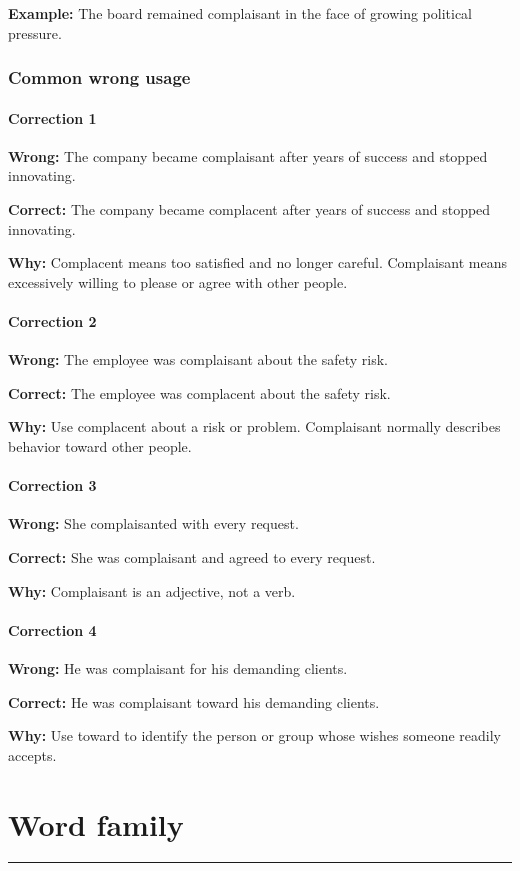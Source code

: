 \documentclass[11pt]{article}
\newcommand{\sectionrule}{\par\vspace{-0.5em}\noindent\textcolor{Accent}{\rule{\linewidth}{0.6pt}}\par}
\begin{document}
\textbf{Example:} The board remained complaisant in the face of growing political pressure.

\subsubsection{Common wrong usage}
\paragraph{Correction 1}
\textbf{Wrong:} The company became complaisant after years of success and stopped innovating.

\textbf{Correct:} The company became complacent after years of success and stopped innovating.

\textbf{Why:} Complacent means too satisfied and no longer careful. Complaisant means excessively willing to please or agree with other people.

\paragraph{Correction 2}
\textbf{Wrong:} The employee was complaisant about the safety risk.

\textbf{Correct:} The employee was complacent about the safety risk.

\textbf{Why:} Use complacent about a risk or problem. Complaisant normally describes behavior toward other people.

\paragraph{Correction 3}
\textbf{Wrong:} She complaisanted with every request.

\textbf{Correct:} She was complaisant and agreed to every request.

\textbf{Why:} Complaisant is an adjective, not a verb.

\paragraph{Correction 4}
\textbf{Wrong:} He was complaisant for his demanding clients.

\textbf{Correct:} He was complaisant toward his demanding clients.

\textbf{Why:} Use toward to identify the person or group whose wishes someone readily accepts.

\section{Word family}
\sectionrule
\end{document}
